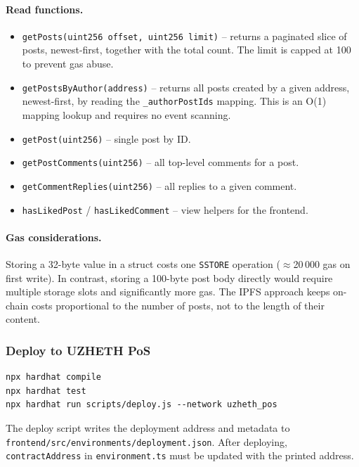 \documentclass[11pt]{article}
\begin{document}
\paragraph{Read functions.}
\begin{itemize}
  \item \texttt{getPosts(uint256 offset, uint256 limit)} – returns a paginated slice of posts, newest-first, together with the total count. The limit is capped at 100 to prevent gas abuse.  \item \texttt{getPostsByAuthor(address)} -- returns all posts created by a given address, newest-first, by reading the \texttt{\_authorPostIds} mapping. This is an O(1) mapping lookup and requires no event scanning.  \item \texttt{getPost(uint256)} – single post by ID.
  \item \texttt{getPostComments(uint256)} – all top-level comments for a post.
  \item \texttt{getCommentReplies(uint256)} – all replies to a given comment.
  \item \texttt{hasLikedPost} / \texttt{hasLikedComment} – view helpers for the frontend.
\end{itemize}

\paragraph{Gas considerations.}
Storing a 32-byte value in a struct costs one \texttt{SSTORE} operation ($\approx$20\,000 gas on first write). In contrast, storing a 100-byte post body directly would require multiple storage slots and significantly more gas. The IPFS approach keeps on-chain costs proportional to the number of posts, not to the length of their content.

\subsubsection{Deploy to UZHETH PoS}

\begin{lstlisting}[style=command]
npx hardhat compile
npx hardhat test
npx hardhat run scripts/deploy.js --network uzheth_pos
\end{lstlisting}

The deploy script writes the deployment address and metadata to \texttt{frontend/src/environments/deployment.json}. After deploying, \texttt{contractAddress} in \texttt{environment.ts} must be updated with the printed address.
\end{document}
